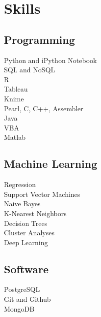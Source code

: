 \documentclass[letterpaper]{deedy-resume} %
\begin{document}
\begin{minipage}[t]{0.33\textwidth} %


\section{Skills}

\subsection{Programming}
Python and iPython Notebook \\
SQL and NoSQL \\
R \\
Tableau \\
Knime \\
Pearl, C, C++, Assembler \\
Java \\
VBA \\
Matlab \\


\sectionspace %

\subsection{Machine Learning}
Regression \\
Support Vector Machines \\
Naive Bayes \\
K-Nearest Neighbors \\
Decision Trees \\
Cluster Analyses \\
Deep Learning \\

\sectionspace %

\subsection{Software}
PostgreSQL \\
Git and Github \\
MongoDB \\


\sectionspace %



\end{minipage}
\end{document}
